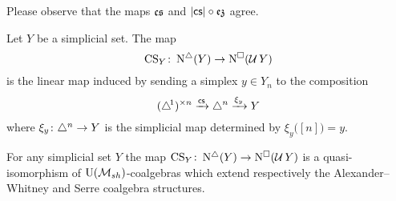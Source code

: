 Please observe that the maps $\operatorname{\mathfrak{cs}}$ and $\lvert\operatorname{\mathsf{cs}}\rvert \circ \operatorname{\mathfrak{ez}}$ agree.

\begin{definition}
	Let $Y$ be a simplicial set.
	The map
	\[
	\operatorname{CS}_Y \colon \operatorname{N^{\triangle}}(Y) \to \operatorname{N^{\square}}(\operatorname{\mathcal{U}} Y)
	\]
	is the linear map induced by sending a simplex $y \in Y_n$ to the composition
	\[
	(\triangle^{\!1})^{\times n} \xrightarrow{\operatorname{\mathsf{cs}}} \triangle^n \xrightarrow{\xi_y} Y
	\]
	where $\xi_y \colon \triangle^n \to Y$ is the simplicial map determined by $\xi_y \big( [n] \big) = y$.
\end{definition}

\begin{theorem} \label{t:main comparison}
	For any simplicial set $Y$ the map $\operatorname{CS}_Y \colon \operatorname{N^{\triangle}}(Y) \to \operatorname{N^{\square}}(\operatorname{\mathcal{U}} Y)$ is a quasi-isomorphism of ${\operatorname{U}(\mathcal{M}_{sh})}$-coalgebras which extend respectively the Alexander--Whitney and Serre coalgebra structures.
\end{theorem}

